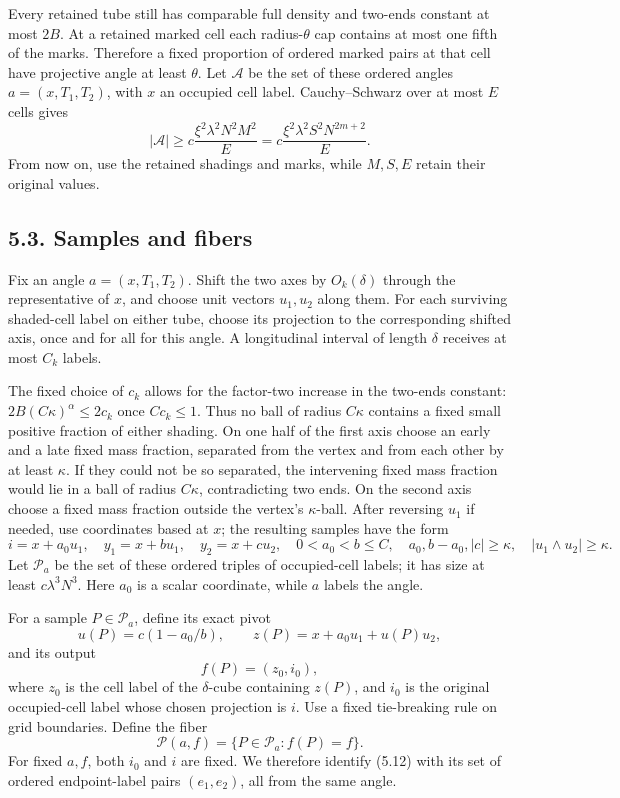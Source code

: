 \documentclass[
  11pt,
  a4paper,
]{article}
\begin{document}
Every retained tube still has comparable full density and two-ends
constant at most \(2B\). At a retained marked cell each
radius-\(\theta\) cap contains at most one fifth of the marks. Therefore
a fixed proportion of ordered marked pairs at that cell have projective
angle at least \(\theta\). Let \(\mathcal A\) be the set of these
ordered angles \(a=(x,T_1,T_2)\), with \(x\) an occupied cell label.
Cauchy--Schwarz over at most \(E\) cells gives \[
 |\mathcal A|\ge c\frac{\xi^2\lambda^2N^2M^2}{E}
 =c\frac{\xi^2\lambda^2S^2N^{2m+2}}{E}.           \tag{5.10}\label{eq:5.10}
\] From now on, use the retained shadings and marks, while \(M,S,E\)
retain their original values.

\hypertarget{samples-and-fibers}{%
\subsection{5.3. Samples and fibers}\label{samples-and-fibers}}

Fix an angle \(a=(x,T_1,T_2)\). Shift the two axes by \(O_k(\delta)\)
through the representative of \(x\), and choose unit vectors \(u_1,u_2\)
along them. For each surviving shaded-cell label on either tube, choose
its projection to the corresponding shifted axis, once and for all for
this angle. A longitudinal interval of length \(\delta\) receives at
most \(C_k\) labels.

The fixed choice of \(c_k\) allows for the factor-two increase in the
two-ends constant: \(2B(C\kappa)^\alpha\le2c_k\) once \(Cc_k\le1\). Thus
no ball of radius \(C\kappa\) contains a fixed small positive fraction
of either shading. On one half of the first axis choose an early and a
late fixed mass fraction, separated from the vertex and from each other
by at least \(\kappa\). If they could not be so separated, the
intervening fixed mass fraction would lie in a ball of radius
\(C\kappa\), contradicting two ends. On the second axis choose a fixed
mass fraction outside the vertex's \(\kappa\)-ball. After reversing
\(u_1\) if needed, use coordinates based at \(x\); the resulting samples
have the form \[
 i=x+a_0u_1,\quad y_1=x+b u_1,\quad y_2=x+c u_2,
 \quad 0<a_0<b\le C,
 \quad a_0,b-a_0,|c|\ge\kappa,
 \quad |u_1\wedge u_2|\ge\kappa.                 \tag{5.11}\label{eq:5.11}
\] Let \(\mathcal P_a\) be the set of these ordered triples of
occupied-cell labels; it has size at least \(c\lambda^3N^3\). Here
\(a_0\) is a scalar coordinate, while \(a\) labels the angle.

For a sample \(P\in\mathcal P_a\), define its exact pivot \[
 u(P)=c(1-a_0/b),\qquad
 z(P)=x+a_0u_1+u(P)u_2,
\] and its output \[
 f(P)=(z_0,i_0),
\] where \(z_0\) is the cell label of the \(\delta\)-cube containing
\(z(P)\), and \(i_0\) is the original occupied-cell label whose chosen
projection is \(i\). Use a fixed tie-breaking rule on grid boundaries.
Define the fiber \[
 \mathcal P(a,f)=\{P\in\mathcal P_a:f(P)=f\}.       \tag{5.12}\label{eq:5.12}
\] For fixed \(a,f\), both \(i_0\) and \(i\) are fixed. We therefore
identify (5.12) with its set of ordered endpoint-label pairs
\((e_1,e_2)\), all from the same angle.
\end{document}
